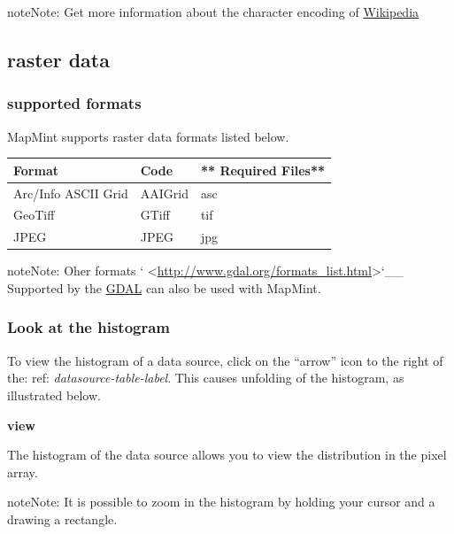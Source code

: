 \documentclass[letterpaper,10pt,english]{sphinxmanual}
\begin{document}
\begin{notice}{note}{Note:}
Get more information about the character encoding of \href{http://fr.wikipedia.org/wiki/Codage\_des\_caract\%C3\%A8res}{Wikipedia}
\end{notice}


\subsection{raster data}
\label{data/datasources:donnees-matricielles}

\subsubsection{supported formats}
\label{data/datasources:id1}
MapMint supports raster data formats listed below.

\begin{tabulary}{\linewidth}{|L|L|L|}
\hline

\textbf{Format}
 & 
\textbf{Code}
 & 
** Required  Files**
\\
\hline
Arc/Info ASCII Grid
 & 
AAIGrid
 & 
asc
\\
\hline
GeoTiff
 & 
GTiff
 & 
tif
\\
\hline
JPEG
 & 
JPEG
 & 
jpg
\\
\hline\end{tabulary}


\begin{notice}{note}{Note:}
Oher formats {}` \textless{}\href{http://www.gdal.org/formats\_list.html}{http://www.gdal.org/formats\_list.html}\textgreater{}{}`\_\_ Supported by the \href{http://www.gdal.org}{GDAL} can also be used with MapMint.
\end{notice}


\subsubsection{Look at the histogram}
\label{data/datasources:consulter-l-histogramme}
To view the histogram of a data source, click on the ``arrow'' icon to the right of the: ref: \emph{datasource-table-label}. This causes unfolding of the histogram, as illustrated below.

{\color{red}\bfseries{}\textbar{}view\textbar{}}

The histogram of the data source allows you to view the distribution in the pixel array.

\begin{notice}{note}{Note:}
It is possible to zoom in the histogram by holding your cursor and a drawing a rectangle.
\end{notice}
\end{document}
